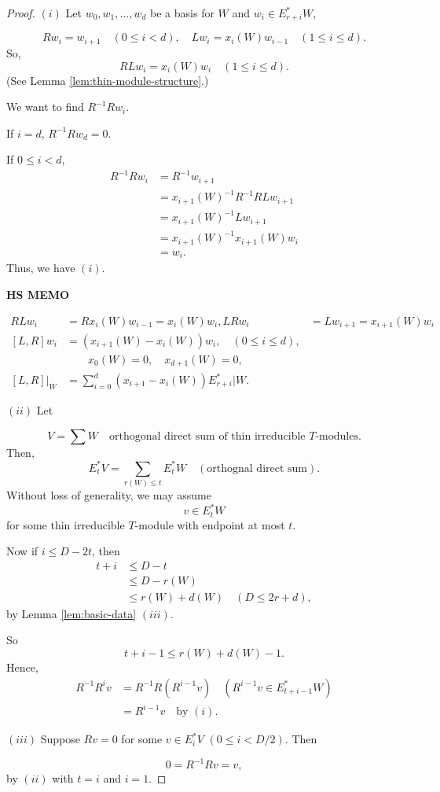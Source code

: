 \documentclass[
]{book}
\theoremstyle{definition}
\theoremstyle{definition}
\theoremstyle{definition}
\theoremstyle{definition}
\theoremstyle{remark}
\begin{document}
\begin{proof}
\leavevmode

\((i)\) Let \(w_0, w_1, \ldots, w_d\) be a basis for \(W\) and \(w_i\in E^*_{r+i}W\),

\[Rw_i = w_{i+1} \quad (0\leq i< d), \quad Lw_i = x_i(W)w_{i-1}\quad (1\leq i\leq d).\]
So,
\[RLw_i = x_i(W)w_i \quad (1\leq i\leq d).\]
(See Lemma \ref{lem:thin-module-structure}.)

We want to find \(R^{-1}Rw_i\).

If \(i=d\), \(R^{-1}Rw_d = 0\).

If \(0\leq i<d\),
\begin{align}
R^{-1}Rw_i & = R^{-1}w_{i+1}\\
& = x_{i+1}(W)^{-1}R^{-1}RLw_{i+1}\\
& = x_{i+1}(W)^{-1}Lw_{i+1}\\
& = x_{i+1}(W)^{-1}x_{i+1}(W)w_i\\
& = w_i.
\end{align}
Thus, we have \((i)\).

\textbf{HS MEMO}

\begin{align}
RLw_i & = Rx_i(W)w_{i-1} = x_i(W)w_i,
LRw_i & = Lw_{i+1} = x_{i+1}(W)w_i\\
[L,R]w_i & = (x_{i+1}(W)-x_i(W))w_i, \quad (0\leq i\leq d),\\
& \qquad x_0(W) = 0, \quad x_{d+1}(W) = 0, \\
[L,R]|_W & = \sum_{i=0}^d(x_{i+1}-x_i(W))E^*_{r+i}|W.
\end{align}

\((ii)\) Let

\[V = \sum W \quad \text{orthogonal direct sum of thin irreducible $T$-modules.}\]
Then,
\[E^*_tV = \sum_{r(W)\leq t}E^*_tW\quad (\text{orthognal direct sum}).\]
Without loss of generality, we may assume
\[v\in E^*_t W\]
for some thin irreducible \(T\)-module with endpoint at most \(t\).

Now if \(i\leq D-2t\), then
\begin{align}
t+i & \leq D-t \\
& \leq D-r(W)\\
& \leq r(W) + d(W) \quad (D\leq 2r+d),
\end{align}
by Lemma \ref{lem:basic-data} \((iii)\).

So
\[t+i-1\leq r(W) + d(W) -1.\]
Hence,
\begin{align}
R^{-1}R^iv & = R^{-1}R(R^{i-1}v) \quad (R^{i-1}v\in E^*_{t+i-1}W)\\
& = R^{i-1}v \quad \text{by $(i)$.}
\end{align}

\((iii)\) Suppose \(Rv = 0\) for some \(v\in E^*_iV\) \((0\leq i< D/2)\). Then

\[0 = R^{-1}Rv = v,\]
by \((ii)\) with \(t = i\) and \(i=1\).

\end{proof}
\end{document}
